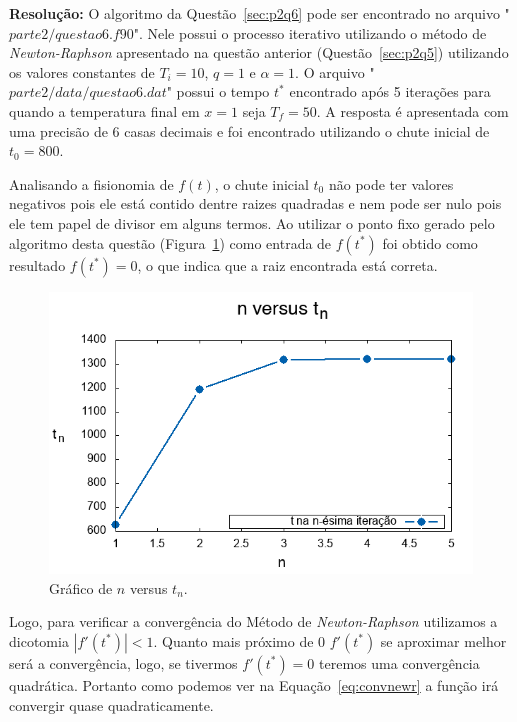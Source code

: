 \documentclass[12pt]{article}
\begin{document}
\textbf{Resolução:}
O algoritmo da Questão~\ref{sec:p2q6} pode ser encontrado no arquivo "$\textit{parte2/questao6.f90}$". Nele possui o processo iterativo utilizando o método de \textit{Newton-Raphson} apresentado na questão anterior (Questão~\ref{sec:p2q5}) utilizando os valores constantes de $T_{i} = 10$, $q = 1$ e $\alpha = 1$. O arquivo "$\textit{parte2/data/questao6.dat}$" possui o tempo $t^{*}$ encontrado após 5 iterações para quando a temperatura final em $x = 1$ seja $T_{f} = 50$. A resposta é apresentada com uma precisão de 6 casas decimais e foi encontrado utilizando o chute inicial de $t_{0} = 800$.

Analisando a fisionomia de $f(t)$, o chute inicial $t_{0}$ não pode ter valores negativos pois ele está contido dentre raizes quadradas e nem pode ser nulo pois ele tem papel de divisor em alguns termos. Ao utilizar o ponto fixo gerado pelo algoritmo desta questão (Figura~\ref{fig:p2q6g1}) como entrada de $f(t^{*})$ foi obtido como resultado $f(t^{*}) = 0$, o que indica que a raiz encontrada está correta.

\begin{figure}[H]
	\centering
	\includegraphics[width=1\textwidth]{p2q6g1.png}
	\caption{Gráfico de $n$ versus $t_{n}$.}
	\label{fig:p2q6g1}
\end{figure}

Logo, para verificar a convergência do Método de \textit{Newton-Raphson} utilizamos a dicotomia $\left| f'(t^{*}) \right| < 1$. Quanto mais próximo de 0  $f'(t^{*})$ se aproximar melhor será a convergência, logo, se tivermos $f'(t^{*}) = 0$ teremos uma convergência quadrática. Portanto como podemos ver na Equação~\ref{eq:convnewr} a função irá convergir quase quadraticamente.
\end{document}
